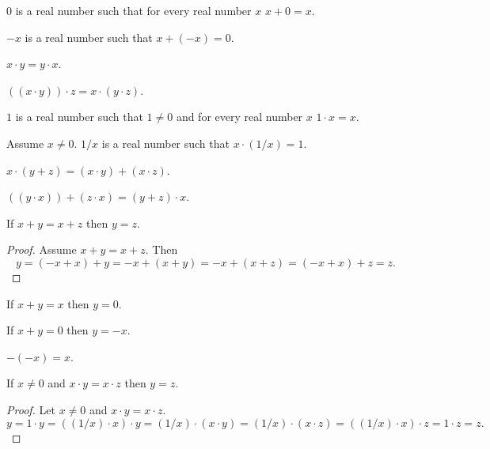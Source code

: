 \documentclass{article}
\begin{document}
\begin{forthel}
\begin{signature}[1 12 A4] $0$ is a real number such that
for every real number $x$ $x + 0 = x$.\end{signature}

\begin{signature}[1 12 A5] $-x$ is a real number such that $x + (-x) = 0$.
\end{signature}

\begin{axiom}[1 12 M2] $x \cdot y = y \cdot x$.\end{axiom}

\begin{axiom}[1 12 M3] $((x \cdot y)) \cdot z = x \cdot (y \cdot z)$.
\end{axiom}

\begin{signature}[1 12 M4] $1$ is a real number such that $1 \neq 0$ and 
for every real number $x$ $1 \cdot x = x$.\end{signature}

\begin{signature}[1 12 M5] Assume $x \neq 0$. $1/x$ is a real number
such that $x \cdot (1/x) = 1$.\end{signature}

\begin{axiom}[1 12 D] $x \cdot (y + z) = (x \cdot y) + (x \cdot z)$.
\end{axiom}
\begin{proposition}[Dist1] $((y \cdot x)) + (z \cdot x) = (y + z) \cdot x$.
\end{proposition}

\begin{proposition}[1 14 a] If $x + y = x + z$ then $y = z$.
\end{proposition}
\begin{proof} Assume $x + y = x + z$. Then 
$$y = (-x+x) + y = -x + (x+y) = -x + (x+z) = (-x+x) + z = z.$$
\end{proof}

\begin{proposition}[1 14 b] If $x + y = x$ then $y = 0$.\end{proposition}
\begin{proposition}[1 14 c] If $x + y = 0$ then $y = -x$.\end{proposition}
\begin{proposition}[1 14 d] $-(-x) = x$.\end{proposition}


\begin{proposition}[1 15 a] If $x \neq 0$ and $x \cdot y = x \cdot z$ 
then $y = z$. \end{proposition}
\begin{proof} Let $x \neq 0$ and $x \cdot y = x \cdot z$.
$$y = 1 \cdot y = ((1/x) \cdot x) \cdot y = (1/x) \cdot (x \cdot y) =
(1/x) \cdot (x \cdot z) = ((1/x) \cdot x) \cdot z = 1 \cdot z = z.$$
\end{proof}


\end{forthel}
\end{document}
